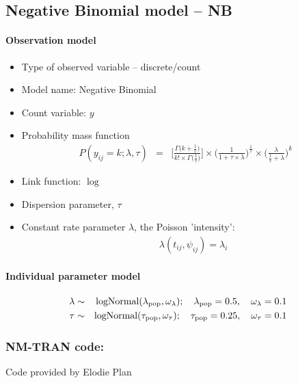 \subsection{Negative Binomial model -- NB}
\label{subsec:NBmodel}

\paragraph{Observation model}

\begin{itemize}
\item
Type of observed variable -- discrete/count
\item
Model name: Negative Binomial
\item
Count variable: $y$
\item
Probability mass function
\begin{eqnarray}
P(y_{ij} = k; \lambda, \tau) &=& \Bigg[ \frac{\Gamma \big( k + \frac{1}{\tau} \big)}{k! \times \Gamma \big(\frac{1}{\tau} \big)} \Bigg] \times \Bigg( \frac{1}{1 + \tau \times \lambda} \Bigg)^{\frac{1}{\tau}} \times \Bigg(\frac{\lambda}{\frac{1}{\tau} + \lambda} \Bigg)^k \nonumber
\end{eqnarray}
\item
Link function: $\log$
\item
Dispersion parameter, $\tau$
\item
Constant rate parameter $\lambda$, the Poisson 'intensity': 
\begin{eqnarray}
&& \lambda(t_{ij}, \psi_{ij}) = \lambda_{i} \nonumber
\end{eqnarray}
\end{itemize}


\paragraph{Individual parameter model}
\begin{eqnarray}
\lambda & \sim& \mbox{logNormal}(\lambda_{\rm pop}, \omega_{\lambda});  \quad \lambda_{\rm pop}=0.5,\quad \omega_{\lambda}=0.1 \nonumber \\
\tau & \sim& \mbox{logNormal}(\tau_{\rm pop}, \omega_{\tau});  \quad \tau_{\rm pop}=0.25,\quad \omega_{\tau}=0.1 \nonumber
\end{eqnarray}


\subsubsection{NM-TRAN code:}
Code provided by Elodie Plan

